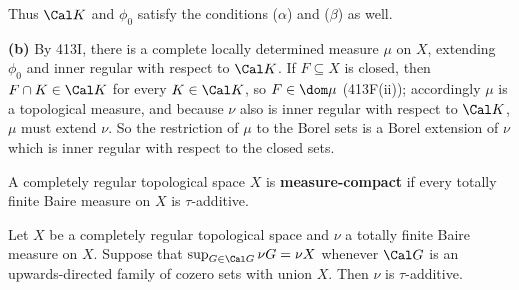 {

\noindent Thus $\Cal K$ and $\phi_0$ satisfy the conditions ($\alpha$)
and ($\beta$) as well.\ \Qed

\medskip

{\bf (b)} By 413I, there is a complete locally determined measure $\mu$
on $X$, extending $\phi_0$ and inner regular with respect to $\Cal K$.
If $F\subseteq X$ is closed, then $F\cap K\in\Cal K$ for every
$K\in\Cal K$, so $F\in\dom\mu$ (413F(ii));  accordingly $\mu$ is a
topological measure, and because $\nu$ also is inner regular with
respect to $\Cal K$, $\mu$ must extend $\nu$.   So the restriction of
$\mu$ to the Borel
sets is a Borel extension of $\nu$ which is inner regular with respect
to the closed sets.
}%


 A completely regular topological space $X$ is
{\bf measure-compact} if
every totally finite Baire measure on $X$ is
$\tau$-additive.

 Let $X$ be a completely regular topological space
and $\nu$ a totally finite Baire measure on $X$.   Suppose that
$\sup_{G\in\Cal G}\nu G=\nu X$ whenever $\Cal G$ is an upwards-directed
family of cozero sets with union $X$.   Then $\nu$ is $\tau$-additive.

